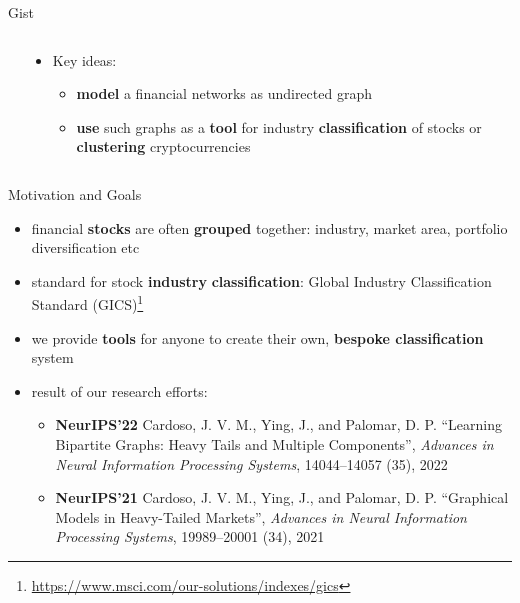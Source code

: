\documentclass[aspectratio=169]{beamer}
\begin{document}
\begin{frame}{Gist}
\begin{minipage}[0.2\textheight]{\textwidth}
  \begin{columns}[T]
  \begin{column}{0.5\textwidth}
       \begin{center}
       \end{center}
  \end{column}
  \begin{column}{0.5\textwidth}
    \vspace{1.5cm}
    \pause
    \begin{itemize}
      \item Key ideas:
   \begin{itemize}
    \pause
   \item \textbf{model} a financial networks as undirected graph
   \pause
   \item \textbf{use} such graphs as a \textbf{tool} for industry \textbf{classification} of stocks or \textbf{clustering} cryptocurrencies
   \end{itemize}
  \end{itemize}
  \end{column}
  \end{columns}
  \end{minipage}
\end{frame}
%
\begin{frame}{Motivation and Goals}
  \vspace{1cm}
  \begin{itemize}
    \pause
    \item financial \textbf{stocks} are often \textbf{grouped} together: industry, market area, portfolio diversification etc
    \pause
    \item standard for stock \textbf{industry} \textbf{classification}: Global Industry Classification Standard (GICS)\footnote{\url{https://www.msci.com/our-solutions/indexes/gics}}
    \pause
    \item we provide \textbf{tools} for anyone to create their own, \textbf{bespoke classification} system 
    \pause
    \item result of our research efforts:
    \begin{itemize}
      \item \textbf{NeurIPS'22} Cardoso, J. V. M., Ying, J., and Palomar, D. P. ``Learning Bipartite Graphs: Heavy Tails and Multiple Components'',
      \textit{Advances in Neural Information Processing Systems}, 14044--14057 (35), 2022
      \item \textbf{NeurIPS'21} Cardoso, J. V. M., Ying, J., and Palomar, D. P. ``Graphical Models in Heavy-Tailed Markets'',
      \textit{Advances in Neural Information Processing Systems}, 19989--20001 (34), 2021 
    \end{itemize}
  \end{itemize}
\end{frame}
\end{document}
